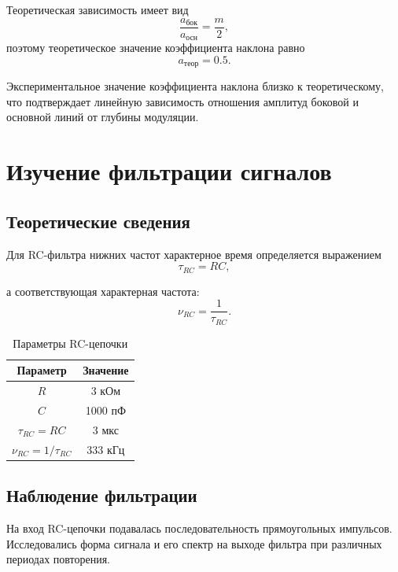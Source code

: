 \documentclass[14pt,a4paper]{extarticle}
\begin{document}
Теоретическая зависимость имеет вид
\[
\frac{a_{\text{бок}}}{a_{\text{осн}}}=\frac{m}{2},
\]
поэтому теоретическое значение коэффициента наклона равно
\[
a_{\text{теор}}=0{.}5.
\]

Экспериментальное значение коэффициента наклона близко к
теоретическому, что подтверждает линейную зависимость отношения
амплитуд боковой и основной линий от глубины модуляции.


\section{Изучение фильтрации сигналов}

\subsection{Теоретические сведения}

Для RC-фильтра нижних частот характерное время определяется выражением
\begin{equation}
\tau_{RC}=RC,
\end{equation}

а соответствующая характерная частота:
\begin{equation}
\nu_{RC}=\frac{1}{\tau_{RC}}.
\end{equation}


\begin{table}[H]
\centering
\caption{Параметры RC-цепочки}
\begin{tabular}{|c|c|}
\hline
Параметр & Значение \\
\hline
$R$ & 3 кОм\\
\hline
$C$ & 1000 пФ\\
\hline
$\tau_{RC}=RC$ & 3 мкс\\
\hline
$\nu_{RC}=1/\tau_{RC}$ & 333 кГц\\
\hline
\end{tabular}
\end{table}

\subsection{Наблюдение фильтрации}

На вход RC-цепочки подавалась последовательность прямоугольных
импульсов. Исследовались форма сигнала и его спектр на выходе
фильтра при различных периодах повторения.
\end{document}
